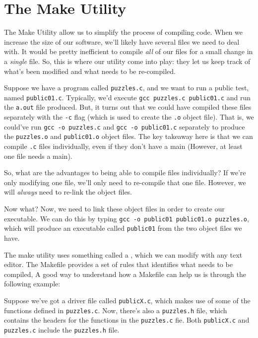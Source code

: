\section{The Make Utility}
The Make Utility allow us to simplify the process of compiling code. When we increase the size of our software, we'll likely have several files we need to deal with. It would be pretty inefficient to compile \textit{all} of our files for a small change in a \textit{single} file.  So, this is where our utility come into play: they let us keep track of what's been modified and what needs to be re-compiled.

Suppose we have a program called \verb!puzzles.c!, and we want to run a public test, named \verb!public01.c!. Typically, we'd execute \verb!gcc puzzles.c public01.c! and run the \verb!a.out! file produced. But, it turns out that we could have compiled these files separately with the \verb!-c! flag (which is used to create the \verb!.o! object file). That is, we could've run \verb!gcc -o puzzles.c! and \verb!gcc -o public01.c! separately to produce the \verb!puzzles.o! and \verb!public01.o! object files. The key takeaway here is that we can compile \verb!.c! files individually, even if they don't have a main (However, at least one file needs a main). 

So, what are the advantages to being able to compile files individually? If we're only modifying one file, we'll only need to re-compile that one file. However, we will \textit{always} need to re-link the object files.


Now what? Now, we need to link these object files in order to create our executable. We can do this by typing \verb!gcc -o public01 public01.o puzzles.o!, which will produce an executable called \verb!public01! from the two object files we have. 


The make utility uses something called a , which we can modify with any text editor. The Makefile provides a set of rules that identifies what needs to be compiled, A good way to understand how a Makefile can help us is through the following example:


Suppose we've got a driver file called \verb!publicX.c!, which makes use of some of the functions defined in \verb!puzzles.c!. Now, there's also a \verb!puzzles.h! file, which contains the headers for the functions in the \verb!puzzles.c! fie. Both \verb!publicX.c! and \verb!puzzles.c! include the \verb!puzzles.h! file. 

